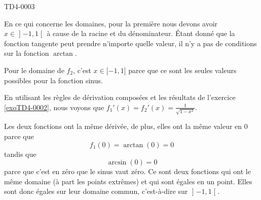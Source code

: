 
\begin{corrige}{TD4-0003}

	En ce qui concerne les domaines, pour la première nous devons avoir $x\in\mathopen] -1 , 1 \mathclose[$ à cause de la racine et du dénominateur. Étant donné que la fonction tangente peut prendre n'importe quelle valeur, il n'y a pas de conditions sur la fonction $\arctan$.

	Pour le domaine de $f_2$, c'est $x\in\mathopen[ -1 , 1 \mathclose]$ parce que ce sont les seules valeurs possibles pour la fonction sinus.

	En utilisant les règles de dérivation composées et les résultats de l'exercice \ref{exoTD4-0002}, nous voyons que $f_1'(x)=f_2'(x)=\frac{1}{ \sqrt{1-x^2} }$.

	Les deux fonctions ont la même dérivée, de plus, elles ont la même valeur en $0$ parce que
	\begin{equation}
		f_1(0)=\arctan(0)=0
	\end{equation}
	tandis que
	\begin{equation}
		\arcsin(0)=0
	\end{equation}
	parce que c'est en zéro que le sinus vaut zéro.	Ce sont deux fonctions qui ont le même domaine (à part les points extrêmes) et qui sont égales en un point. Elles sont donc égales sur leur domaine commun, c'est-à-dire sur $\mathopen] -1 , 1 \mathclose[$.

\end{corrige}
